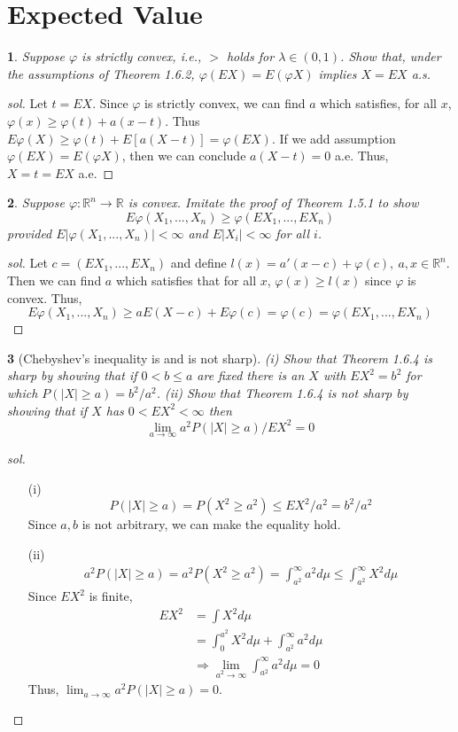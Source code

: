 \documentclass{report}
\newtheorem{ex}{}[section]
\begin{document}
\section{Expected Value}
\begin{ex}
Suppose $\varphi$ is strictly convex, i.e., $>$ holds for $\lambda \in (0,1)$. Show that, under the assumptions of Theorem 1.6.2, $\varphi(EX) = E(\varphi X)$ implies $X = EX$ a.s.
\end{ex}
\begin{proof}[sol]
Let $t = EX$. Since $\varphi$ is strictly convex, we can find $a$ which satisfies, for all $x$, $\varphi(x) \ge \varphi(t) + a(x -t)$. Thus $E\varphi(X) \ge \varphi(t) + E[a(X - t)] = \varphi(EX)$. If we add assumption $\varphi(EX) = E(\varphi X)$, then we can conclude $a(X - t) = 0$ a.e. Thus, $X = t = EX$ a.e. 
\end{proof}
\begin{ex}
Suppose $\varphi : \mathbb{R}^n \to \mathbb{R}$ is convex. Imitate the proof of Theorem 1.5.1 to show
\[E \varphi(X_1,...,X_n) \ge \varphi(EX_1,...,EX_n)\]
provided $E|\varphi(X_1,...,X_n)| < \infty$ and $E|X_i| < \infty$ for all $i$.
\end{ex}
\begin{proof}[sol]
Let $c = (EX_1,...,EX_n)$ and define $l(x) = a'(x-c) + \varphi(c),\  a,x \in \mathbb{R}^n$. Then we can find $a$ which satisfies that for all $x$, $\varphi(x) \ge l(x)$ since $\varphi$ is convex. Thus,
\[E\varphi(X_1,...,X_n) \ge aE(X - c) + E\varphi(c) = \varphi(c) = \varphi(EX_1,...,EX_n)\]
\end{proof}
\begin{ex}[Chebyshev's inequality is and is not sharp]
(i) Show that Theorem 1.6.4 is sharp by showing that if $0 < b \le a$ are fixed there is an $X$ with $EX^2 = b^2$ for which $P(|X| \ge a) = b^2/a^2$. (ii) Show that Theorem 1.6.4 is not sharp by showing that if $X$ has $0 < EX^2 <\infty$ then
\[\lim_{a\to\infty} a^2 P(|X| \ge a)/EX^2 = 0\]
\end{ex}
\begin{proof}[sol]~
\begin{enumerate}
    \item[(i)]
    \[P(|X| \ge a) = P(X^2 \ge a^2) \le EX^2 /a^2 = b^2/a^2\]
    Since $a,b$ is not arbitrary, we can make the equality hold.
    \item[(ii)]
    \begin{align*}
        a^2P(|X| \ge a) = a^2P(X^2 \ge a^2) = \int_{a^2}^\infty a^2d\mu\le \int_{a^2}^\infty X^2d\mu
    \end{align*}
    Since $EX^2$ is finite,
    \begin{align*}
        EX^2 &= \int X^2d\mu\\
        &=\int_0^{a^2} X^2d\mu + \int_{a^2}^\infty a^2d\mu\\
        &\Rightarrow \lim_{a^2\to\infty}\int_{a^2}^\infty a^2d\mu = 0
    \end{align*}
    Thus, $\lim_{a\to\infty}a^2 P(|X| \ge a) = 0$.
\end{enumerate}
\end{proof}
\end{document}
